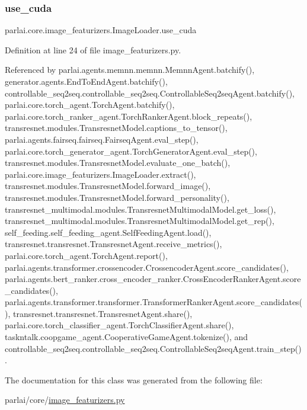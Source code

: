 \subsubsection{\texorpdfstring{use\+\_\+cuda}{use\_cuda}}
{\footnotesize\ttfamily parlai.\+core.\+image\+\_\+featurizers.\+Image\+Loader.\+use\+\_\+cuda}



Definition at line 24 of file image\+\_\+featurizers.\+py.



Referenced by parlai.\+agents.\+memnn.\+memnn.\+Memnn\+Agent.\+batchify(), generator.\+agents.\+End\+To\+End\+Agent.\+batchify(), controllable\+\_\+seq2seq.\+controllable\+\_\+seq2seq.\+Controllable\+Seq2seq\+Agent.\+batchify(), parlai.\+core.\+torch\+\_\+agent.\+Torch\+Agent.\+batchify(), parlai.\+core.\+torch\+\_\+ranker\+\_\+agent.\+Torch\+Ranker\+Agent.\+block\+\_\+repeats(), transresnet.\+modules.\+Transresnet\+Model.\+captions\+\_\+to\+\_\+tensor(), parlai.\+agents.\+fairseq.\+fairseq.\+Fairseq\+Agent.\+eval\+\_\+step(), parlai.\+core.\+torch\+\_\+generator\+\_\+agent.\+Torch\+Generator\+Agent.\+eval\+\_\+step(), transresnet.\+modules.\+Transresnet\+Model.\+evaluate\+\_\+one\+\_\+batch(), parlai.\+core.\+image\+\_\+featurizers.\+Image\+Loader.\+extract(), transresnet.\+modules.\+Transresnet\+Model.\+forward\+\_\+image(), transresnet.\+modules.\+Transresnet\+Model.\+forward\+\_\+personality(), transresnet\+\_\+multimodal.\+modules.\+Transresnet\+Multimodal\+Model.\+get\+\_\+loss(), transresnet\+\_\+multimodal.\+modules.\+Transresnet\+Multimodal\+Model.\+get\+\_\+rep(), self\+\_\+feeding.\+self\+\_\+feeding\+\_\+agent.\+Self\+Feeding\+Agent.\+load(), transresnet.\+transresnet.\+Transresnet\+Agent.\+receive\+\_\+metrics(), parlai.\+core.\+torch\+\_\+agent.\+Torch\+Agent.\+report(), parlai.\+agents.\+transformer.\+crossencoder.\+Crossencoder\+Agent.\+score\+\_\+candidates(), parlai.\+agents.\+bert\+\_\+ranker.\+cross\+\_\+encoder\+\_\+ranker.\+Cross\+Encoder\+Ranker\+Agent.\+score\+\_\+candidates(), parlai.\+agents.\+transformer.\+transformer.\+Transformer\+Ranker\+Agent.\+score\+\_\+candidates(), transresnet.\+transresnet.\+Transresnet\+Agent.\+share(), parlai.\+core.\+torch\+\_\+classifier\+\_\+agent.\+Torch\+Classifier\+Agent.\+share(), taskntalk.\+coopgame\+\_\+agent.\+Cooperative\+Game\+Agent.\+tokenize(), and controllable\+\_\+seq2seq.\+controllable\+\_\+seq2seq.\+Controllable\+Seq2seq\+Agent.\+train\+\_\+step().



The documentation for this class was generated from the following file\+:\begin{DoxyCompactItemize}
\item 
parlai/core/\hyperlink{image__featurizers_8py}{image\+\_\+featurizers.\+py}\end{DoxyCompactItemize}
